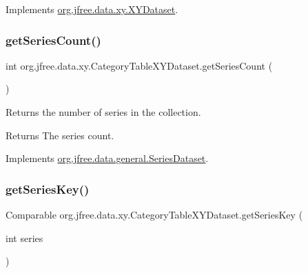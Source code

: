Implements \mbox{\hyperlink{interfaceorg_1_1jfree_1_1data_1_1xy_1_1_x_y_dataset_ae81f9de91dfcae45028fc8a486a119da}{org.\+jfree.\+data.\+xy.\+X\+Y\+Dataset}}.

\mbox{\label{classorg_1_1jfree_1_1data_1_1xy_1_1_category_table_x_y_dataset_a95fbc1a24943e6a3f780f0273bbb55e8}} 
\subsubsection{\texorpdfstring{get\+Series\+Count()}{getSeriesCount()}}
{\footnotesize\ttfamily int org.\+jfree.\+data.\+xy.\+Category\+Table\+X\+Y\+Dataset.\+get\+Series\+Count (\begin{DoxyParamCaption}{ }\end{DoxyParamCaption})}

Returns the number of series in the collection.

\begin{DoxyReturn}{Returns}
The series count. 
\end{DoxyReturn}


Implements \mbox{\hyperlink{interfaceorg_1_1jfree_1_1data_1_1general_1_1_series_dataset_a84fe822f5918f941d9de1ed1b73c9f58}{org.\+jfree.\+data.\+general.\+Series\+Dataset}}.

\mbox{\label{classorg_1_1jfree_1_1data_1_1xy_1_1_category_table_x_y_dataset_afc6ee3d37adf99d733ebf0289f6e6ffb}} 
\subsubsection{\texorpdfstring{get\+Series\+Key()}{getSeriesKey()}}
{\footnotesize\ttfamily Comparable org.\+jfree.\+data.\+xy.\+Category\+Table\+X\+Y\+Dataset.\+get\+Series\+Key (\begin{DoxyParamCaption}\item[{int}]{series }\end{DoxyParamCaption})}


